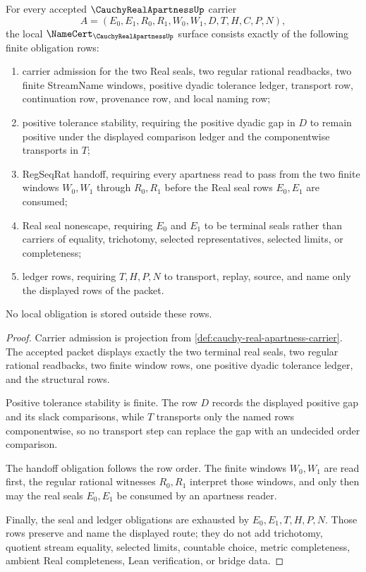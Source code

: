 \begin{theorem}
\label{thm:cauchy-real-apartness-namecert-obligations}
For every accepted $\CauchyRealApartnessUp$ carrier
$$
A=(E_0,E_1,R_0,R_1,W_0,W_1,D,T,H,C,P,N),
$$
the local $\NameCert_{\CauchyRealApartnessUp}$ surface consists exactly of the following finite obligation rows:
\begin{enumerate}
\item carrier admission for the two Real seals, two regular rational readbacks, two finite StreamName windows, positive dyadic tolerance ledger, transport row, continuation row, provenance row, and local naming row;
\item positive tolerance stability, requiring the positive dyadic gap in $D$ to remain positive under the displayed comparison ledger and the componentwise transports in $T$;
\item RegSeqRat handoff, requiring every apartness read to pass from the two finite windows $W_0,W_1$ through $R_0,R_1$ before the Real seal rows $E_0,E_1$ are consumed;
\item Real seal nonescape, requiring $E_0$ and $E_1$ to be terminal seals rather than carriers of equality, trichotomy, selected representatives, selected limits, or completeness;
\item ledger rows, requiring $T,H,P,N$ to transport, replay, source, and name only the displayed rows of the packet.
\end{enumerate}
No local obligation is stored outside these rows.
\end{theorem}
\begin{proof}
Carrier admission is projection from \autoref{def:cauchy-real-apartness-carrier}. The accepted packet displays exactly the two terminal real seals, two regular rational readbacks, two finite window rows, one positive dyadic tolerance ledger, and the structural rows.

Positive tolerance stability is finite. The row $D$ records the displayed positive gap and its slack comparisons, while $T$ transports only the named rows componentwise, so no transport step can replace the gap with an undecided order comparison.

The handoff obligation follows the row order. The finite windows $W_0,W_1$ are read first, the regular rational witnesses $R_0,R_1$ interpret those windows, and only then may the real seals $E_0,E_1$ be consumed by an apartness reader.

Finally, the seal and ledger obligations are exhausted by $E_0,E_1,T,H,P,N$. Those rows preserve and name the displayed route; they do not add trichotomy, quotient stream equality, selected limits, countable choice, metric completeness, ambient Real completeness, Lean verification, or bridge data.
\end{proof}

